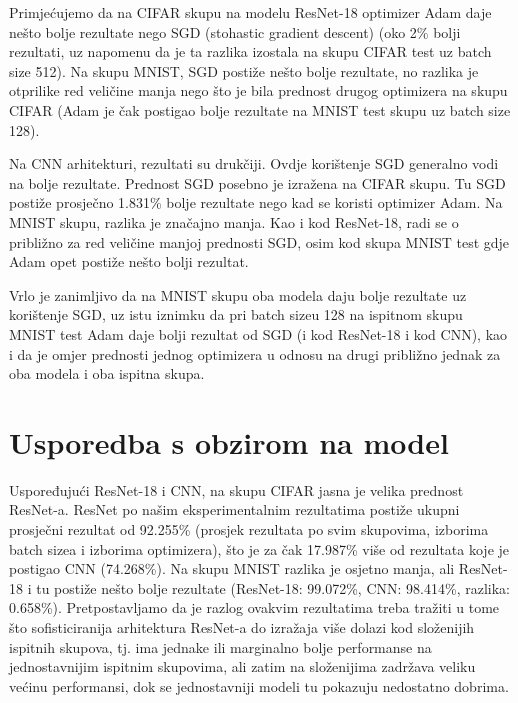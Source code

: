 Primjećujemo da na CIFAR skupu na modelu ResNet-18 optimizer Adam daje nešto bolje rezultate nego SGD (stohastic gradient descent) (oko 2\% bolji rezultati, uz napomenu da je ta razlika izostala na skupu CIFAR test uz batch size 512). Na skupu MNIST, SGD postiže nešto bolje rezultate, no razlika je otprilike red veličine manja nego što je bila prednost drugog optimizera na skupu CIFAR (Adam je čak postigao bolje rezultate na MNIST test skupu uz batch size 128).

\bigskip

Na CNN arhitekturi, rezultati su drukčiji. Ovdje korištenje SGD generalno vodi na bolje rezultate. Prednost SGD posebno je izražena na CIFAR skupu. Tu SGD postiže prosječno 1.831\% bolje rezultate nego kad se koristi optimizer Adam. Na MNIST skupu, razlika je značajno manja. Kao i kod ResNet-18, radi se o približno za red veličine manjoj prednosti SGD, osim kod skupa MNIST test gdje Adam opet postiže nešto bolji rezultat.

\bigskip

Vrlo je zanimljivo da na MNIST skupu oba modela daju bolje rezultate uz korištenje SGD, uz istu iznimku da pri batch sizeu 128 na ispitnom skupu MNIST test Adam daje bolji rezultat od SGD (i kod ResNet-18 i kod CNN), kao i da je omjer prednosti jednog optimizera u odnosu na drugi približno jednak za oba modela i oba ispitna skupa.

\bigskip

\section{Usporedba s obzirom na model}

Uspoređujući ResNet-18 i CNN, na skupu CIFAR jasna je velika prednost ResNet-a. ResNet po našim eksperimentalnim rezultatima postiže ukupni prosječni rezultat od 92.255\% (prosjek rezultata po svim skupovima, izborima batch sizea i izborima optimizera), što je za čak 17.987\% više od rezultata koje je postigao CNN (74.268\%). Na skupu MNIST razlika je osjetno manja, ali ResNet-18 i tu postiže nešto bolje rezultate (ResNet-18: 99.072\%, CNN: 98.414\%, razlika: 0.658\%). Pretpostavljamo da je razlog ovakvim rezultatima treba tražiti u tome što sofisticiranija arhitektura ResNet-a do izražaja više dolazi kod složenijih ispitnih skupova, tj. ima jednake ili marginalno bolje performanse na jednostavnijim ispitnim skupovima, ali zatim na složenijima zadržava veliku većinu performansi, dok se jednostavniji modeli tu pokazuju nedostatno dobrima.


